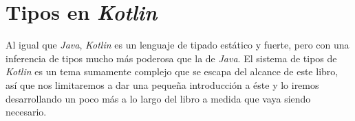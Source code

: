 \section{Tipos en \textit{Kotlin}}
  Al igual que \textit{Java}, \textit{Kotlin} es un lenguaje de tipado estático y fuerte, pero con 
  una inferencia de tipos mucho más poderosa que la de \textit{Java}.
  El sistema de tipos de \textit{Kotlin} es un tema sumamente complejo que se escapa del alcance de 
  este libro, así que nos limitaremos a dar una pequeña introducción a éste y lo iremos
  desarrollando un poco más a lo largo del libro a medida que vaya siendo necesario.



  